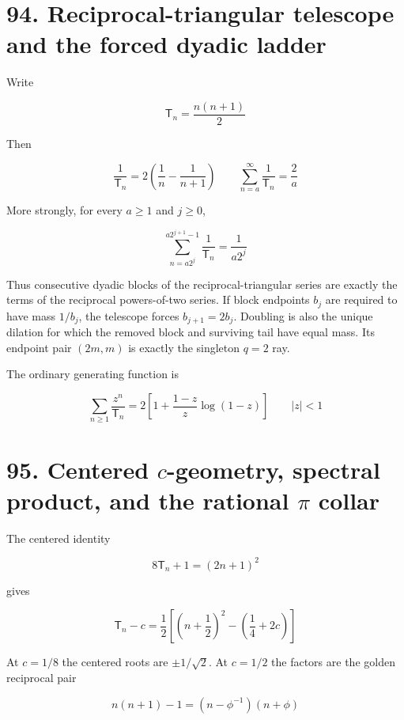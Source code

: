 \documentclass[
  11pt,
]{book}
\begin{document}
\section{94. Reciprocal-triangular telescope and the forced dyadic
ladder}\label{reciprocal-triangular-telescope-and-the-forced-dyadic-ladder}

Write

\[
\mathsf T_n=\frac{n(n+1)}2
\]

Then

\[
\boxed{
\frac1{\mathsf T_n}=2\left(\frac1n-\frac1{n+1}\right)
\qquad
\sum_{n=a}^{\infty}\frac1{\mathsf T_n}=\frac2a
}
\tag{94.1}
\]

More strongly, for every \(a\ge1\) and \(j\ge0\),

\[
\boxed{
\sum_{n=a2^j}^{a2^{j+1}-1}\frac1{\mathsf T_n}
=\frac1{a2^j}
}
\tag{94.2}
\]

Thus consecutive dyadic blocks of the reciprocal-triangular series are
exactly the terms of the reciprocal powers-of-two series. If block
endpoints \(b_j\) are required to have mass \(1/b_j\), the telescope
forces \(b_{j+1}=2b_j\). Doubling is also the unique dilation for which
the removed block and surviving tail have equal mass. Its endpoint pair
\((2m,m)\) is exactly the singleton \(q=2\) ray.

The ordinary generating function is

\[
\sum_{n\ge1}\frac{z^n}{\mathsf T_n}
=2\left[1+\frac{1-z}{z}\log(1-z)\right]
\qquad |z|<1
\tag{94.3}
\]

\section{\texorpdfstring{95. Centered \(c\)-geometry, spectral product,
and the rational \(\pi\)
collar}{95. Centered c-geometry, spectral product, and the rational \textbackslash pi collar}}\label{centered-c-geometry-spectral-product-and-the-rational-pi-collar}

The centered identity

\[
\boxed{8\mathsf T_n+1=(2n+1)^2}
\tag{95.1}
\]

gives

\[
\mathsf T_n-c
=\frac12\left[\left(n+\frac12\right)^2-\left(\frac14+2c\right)\right]
\tag{95.2}
\]

At \(c=1/8\) the centered roots are \(\pm1/\sqrt2\). At \(c=1/2\) the
factors are the golden reciprocal pair

\[
n(n+1)-1=(n-\phi^{-1})(n+\phi)
\tag{95.3}
\]
\end{document}
